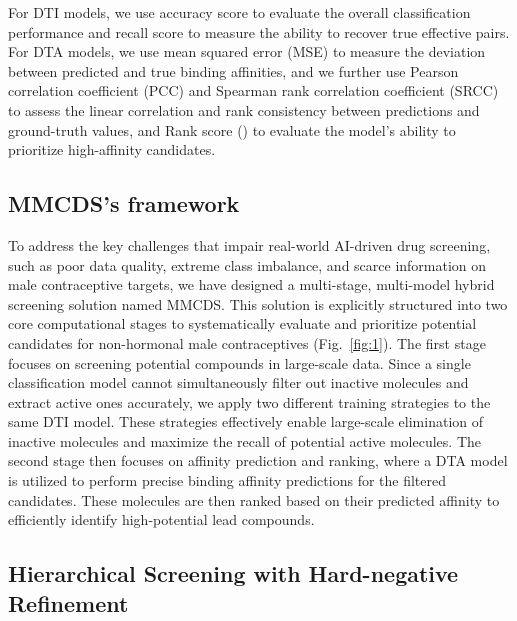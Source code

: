 \documentclass[unnumsec,webpdf,contemporary,large]{oup-authoring-template}%
\theoremstyle{thmstyleone}%
\theoremstyle{thmstyletwo}%
\theoremstyle{thmstylethree}%
\begin{document}
For DTI models, we use accuracy score to evaluate the overall classification performance and recall score to measure the ability to recover true effective pairs.
For DTA models, we use mean squared error (MSE) to measure the deviation between predicted and true binding affinities, and we further use Pearson correlation coefficient (PCC) and Spearman rank correlation coefficient (SRCC) to assess the linear correlation and rank consistency between predictions and ground-truth values, and Rank score (\citealt{47}) to evaluate the model’s ability to prioritize high-affinity candidates.



\subsection*{MMCDS's framework}

To address the key challenges that impair real-world AI-driven drug screening, such as poor data quality, extreme class imbalance, and scarce information on male contraceptive targets, we have designed a multi-stage, multi-model hybrid screening solution named MMCDS. This solution is explicitly structured into two core computational stages to systematically evaluate and prioritize potential candidates for non-hormonal male contraceptives (Fig.~\ref{fig:1}). The first stage focuses on screening potential compounds in large-scale data. Since a single classification model cannot simultaneously filter out inactive molecules and extract active ones accurately, we apply two different training strategies to the same DTI model. These strategies effectively enable large-scale elimination of inactive molecules and maximize the recall of potential active molecules. The second stage then focuses on affinity prediction and ranking, where a DTA model is utilized to perform precise binding affinity predictions for the filtered candidates. These molecules are then ranked based on their predicted affinity to efficiently identify high-potential lead compounds.



\subsection*{Hierarchical Screening with Hard-negative Refinement} 

\end{document}
